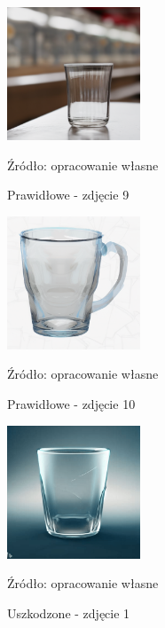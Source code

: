 \begin{figure}[htbp]
  \centering
  \caption{Prawidłowe - zdjęcie 9}
  \includegraphics[width=150px]{images/success_9.png}
  \begin{center}
  \footnotesize{Źródło: opracowanie własne}
  \end{center}
  \label{fig:zdjecie_poprawne_9}
\end{figure}

\begin{figure}[htbp]
  \centering
  \caption{Prawidłowe - zdjęcie 10}
  \includegraphics[width=150px]{images/success_10.png}
  \begin{center}
  \footnotesize{Źródło: opracowanie własne}
  \end{center}
  \label{fig:zdjecie_poprawne_10}
\end{figure}

\begin{figure}[htbp]
  \centering
  \caption{Uszkodzone - zdjęcie 1}
  \includegraphics[width=150px]{images/failure_1.png}
  \begin{center}
  \footnotesize{Źródło: opracowanie własne}
  \end{center}
  \label{fig:zdjecie_uszkodzone_1}
\end{figure}

